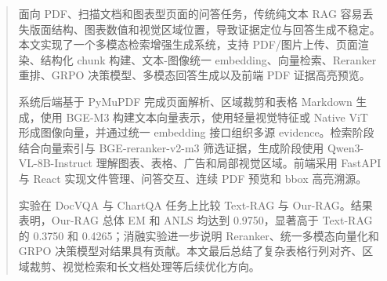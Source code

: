 \begin{abstract}
面向 PDF、扫描文档和图表型页面的问答任务，传统纯文本 RAG 容易丢失版面结构、图表数值和视觉区域位置，导致证据定位与回答生成不稳定。本文实现了一个多模态检索增强生成系统，支持 PDF/图片上传、页面渲染、结构化 chunk 构建、文本-图像统一 embedding、向量检索、Reranker 重排、GRPO 决策模型、多模态回答生成以及前端 PDF 证据高亮预览。

系统后端基于 PyMuPDF 完成页面解析、区域裁剪和表格 Markdown 生成，使用 BGE-M3 构建文本向量表示，使用轻量视觉特征或 Native ViT 形成图像向量，并通过统一 embedding 接口组织多源 evidence。检索阶段结合向量索引与 BGE-reranker-v2-m3 筛选证据，生成阶段使用 Qwen3-VL-8B-Instruct 理解图表、表格、广告和局部视觉区域。前端采用 FastAPI 与 React 实现文件管理、问答交互、连续 PDF 预览和 bbox 高亮溯源。

实验在 DocVQA 与 ChartQA 任务上比较 Text-RAG 与 Our-RAG。结果表明，Our-RAG 总体 EM 和 ANLS 均达到 0.9750，显著高于 Text-RAG 的 0.3750 和 0.4265；消融实验进一步说明 Reranker、统一多模态向量化和 GRPO 决策模型对结果具有贡献。本文最后总结了复杂表格行列对齐、区域裁剪、视觉检索和长文档处理等后续优化方向。

\end{abstract}
